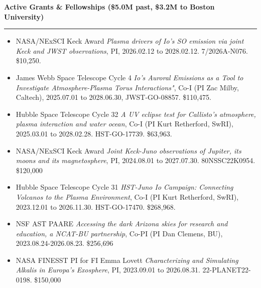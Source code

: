 \documentclass[12pt]{report}
\newcommand{\numitems}[1]{\getrefnumber{#1}}
\begin{document}
\vspace{2 mm}
\noindent\bf{Active Grants \& Fellowships (\$5.0M past, \$3.2M to Boston University)} \rm\hspace*{\fill} \\
\rule{\textwidth}{1pt}



\begin{itemize} \itemsep -2pt %
 \item NASA/NExSCI Keck Award {\it Plasma drivers of Io's SO emission via joint Keck and JWST observations}, PI, 2026.02.12 to 2028.02.12. 7/2026A-N076. \$10,250.
 \item James Webb Space Telescope Cycle 4 {\it Io's Auroral Emissions as a Tool to Investigate Atmosphere-Plasma Torus Interactions"}, Co-I (PI Zac Milby, Caltech), 2025.07.01 to 2028.06.30, JWST-GO-08857. \$110,475. 
 \item Hubble Space Telescope Cycle 32 {\it A UV eclipse test for Callisto's atmosphere, plasma interaction and water ocean}, Co-I (PI Kurt Retherford, SwRI), 2025.03.01 to 2028.02.28. HST-GO-17739. \$63,963. 
 \item NASA/NExSCI Keck Award {\it Joint Keck-Juno observations of Jupiter, its moons and its magnetosphere}, PI, 2024.08.01 to 2027.07.30. 80NSSC22K0954. \$120,000
 \item Hubble Space Telescope Cycle 31 {\it HST-Juno Io Campaign: Connecting Volcanos to the Plasma Environment}, Co-I (PI Kurt Retherford, SwRI), 2023.12.01 to 2026.11.30. HST-GO-17470. \$268,968. 
 \item NSF AST PAARE {\it Accessing the dark Arizona skies for research and education, a NCAT-BU partnership}, Co-PI (PI Dan Clemens, BU), 2023.08.24-2026.08.23. \$256,696
 \item NASA FINESST PI for FI Emma Lovett {\it Characterizing and Simulating Alkalis in Europa’s Exosphere}, PI, 2023.09.01 to 2026.08.31. 22-PLANET22-0198. \$150,000

\end{itemize}
\end{document}
